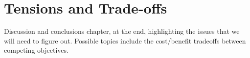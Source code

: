 \chapter[Tensions and Trade-offs]{Tensions and Trade-offs}
\def\chpname{tradeoffs}\label{chp:\chpname}


Discussion and conclusions chapter, at the end, highlighting the
issues that we will need to figure out. Possible topics include the
cost/benefit tradeoffs between competing objectives.
